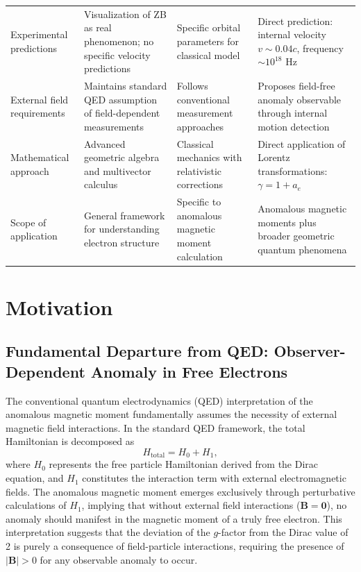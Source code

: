 \documentclass[%
 reprint,
 amsmath,amssymb,
 aps,
]{revtex4-1}
\numberwithin{equation}{section}%
\begin{document}
\begin{table}[t!]
\begin{tabular}{p{4.2cm}p{4.0cm}p{4.0cm}p{4.0cm}}
\addlinespace[0.3cm]
Experimental predictions & Visualization of ZB as real phenomenon; no specific velocity predictions & Specific orbital parameters for classical model & Direct prediction: internal velocity $v \sim 0.04c$, frequency $\sim 10^{18}$ Hz \\
\addlinespace[0.3cm]
External field requirements & Maintains standard QED assumption of field-dependent measurements & Follows conventional measurement approaches & Proposes field-free anomaly observable through internal motion detection \\
\addlinespace[0.3cm]
Mathematical approach & Advanced geometric algebra and multivector calculus & Classical mechanics with relativistic corrections & Direct application of Lorentz transformations: $\gamma = 1 + a_e$ \\
\addlinespace[0.3cm]
Scope of application & General framework for understanding electron structure & Specific to anomalous magnetic moment calculation & Anomalous magnetic moments plus broader geometric quantum phenomena \\
\bottomrule
\end{tabular}
\end{table}


\section{Motivation}

\subsection{Fundamental Departure from QED: Observer-Dependent Anomaly in Free Electrons}

The conventional quantum electrodynamics (QED) interpretation of the anomalous magnetic moment fundamentally assumes the necessity of external magnetic field interactions. In the standard QED framework, the total Hamiltonian is decomposed as 
\begin{equation}
H_{\text{total}} = H_0 + H_1,
\end{equation}
where $H_0$ represents the free particle Hamiltonian derived from the Dirac equation, and $H_1$ constitutes the interaction term with external electromagnetic fields. The anomalous magnetic moment emerges exclusively through perturbative calculations of $H_1$, implying that without external field interactions ($\mathbf{B} = \mathbf{0}$), no anomaly should manifest in the magnetic moment of a truly free electron. This interpretation suggests that the deviation of the $g$-factor from the Dirac value of 2 is purely a consequence of field-particle interactions, requiring the presence of $|\mathbf{B}| > 0$ for any observable anomaly to occur.
\end{document}
